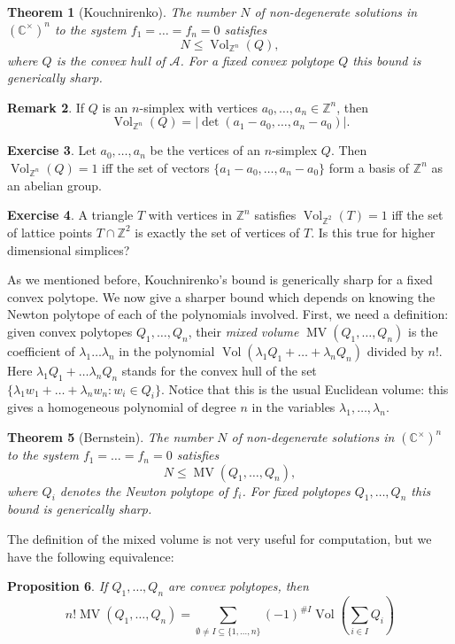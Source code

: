 \documentclass[11pt, a4paper]{article}
\newcommand{\ZZ}{\mathbb{Z}}
\newcommand{\CC}{\mathbb{C}}
\DeclareMathOperator{\Vol}{Vol}
\DeclareMathOperator{\MV}{MV}
\theoremstyle{plain}
\newtheorem{prop}{Proposition}[section]
\newtheorem{thm}[prop]{Theorem}
\theoremstyle{definition}
\newtheorem{rem}[prop]{Remark}
\newtheorem{ex}[prop]{Exercise}
\begin{document}
\begin{thm}[Kouchnirenko] The number $N$ of non-degenerate solutions in $(\CC^\times)^n$ to the system $f_1=\dots=f_n=0$ satisfies
\[N\leq \Vol_{\ZZ^n}(Q),\]
where $Q$ is the convex hull of $\mathcal{A}$. For a fixed convex polytope $Q$ this bound is generically sharp.
\end{thm}

\begin{rem} If $Q$ is an $n$-simplex with vertices $a_0,\dots, a_n\in \ZZ^n$, then
\[\Vol_{\ZZ^n}(Q)=\left|\det(a_1-a_0, \dots, a_n-a_0) \right|.\]
\end{rem}

\begin{ex} Let $a_0,\dots,a_n$ be the vertices of an $n$-simplex $Q$. Then $\Vol_{\ZZ^n}(Q)=1$ iff the set of vectors $\{a_1-a_0,\dots, a_n-a_0\}$ form a basis of $\ZZ^n$ as an abelian group.
\end{ex}
\begin{ex} A triangle $T$ with vertices in $\ZZ^n$ satisfies $\Vol_{\ZZ^2}(T)=1$ iff the set of lattice points $T\cap\ZZ^2$ is exactly the set of vertices of $T$. Is this true for higher dimensional simplices?
\end{ex}

As we mentioned before, Kouchnirenko's bound is generically sharp for a fixed convex polytope. We now give a sharper bound which depends on knowing the Newton polytope of each of the polynomials involved. First, we need a definition: given convex polytopes $Q_1,\dots,Q_n$, their \emph{mixed volume} $\MV(Q_1,\dots,Q_n)$ is the coefficient of $\lambda_1\dots\lambda_n$ in the polynomial $\Vol(\lambda_1 Q_1+\dots+\lambda_nQ_n)$ divided by $n!$. Here $\lambda_1Q_1+\dots\lambda_nQ_n$ stands for the convex hull of the set $\{\lambda_1 w_1+\dots+\lambda_n w_n:w_i\in Q_i\}$. Notice that this is the usual Euclidean volume: this gives a homogeneous polynomial of degree $n$ in the variables $\lambda_1,\dots,\lambda_n$.

\begin{thm}[Bernstein] The number $N$ of non-degenerate solutions in $(\CC^\times)^n$ to the system $f_1=\dots=f_n=0$ satisfies
\[N\leq \MV(Q_1,\dots,Q_n),\]
where $Q_i$ denotes the Newton polytope of $f_i$. For fixed polytopes $Q_1,\dots,Q_n$ this bound is generically sharp.
\end{thm}

The definition of the mixed volume is not very useful for computation, but we have the following equivalence:
\begin{prop} If $Q_1,\dots,Q_n$ are convex polytopes, then
\[n! \MV(Q_1,\dots,Q_n)=\sum_{\emptyset\neq I\subseteq\{1,\dots,n\}}(-1)^{\#I}\Vol\left(\sum_{i\in I} Q_i\right)\]
\end{prop}
\end{document}
